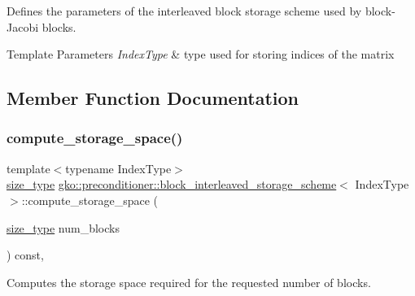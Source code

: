 Defines the parameters of the interleaved block storage scheme used by block-\/\+Jacobi blocks. 


\begin{DoxyTemplParams}{Template Parameters}
{\em Index\+Type} & type used for storing indices of the matrix \\
\hline
\end{DoxyTemplParams}


\subsection{Member Function Documentation}
\mbox{\label{structgko_1_1preconditioner_1_1block__interleaved__storage__scheme_ae46b38432c1e1b87d5743a649f2cfe84}} 
\subsubsection{\texorpdfstring{compute\+\_\+storage\+\_\+space()}{compute\_storage\_space()}}
{\footnotesize\ttfamily template$<$typename Index\+Type$>$ \\
\hyperlink{namespacegko_a6e5c95df0ae4e47aab2f604a22d98ee7}{size\+\_\+type} \hyperlink{structgko_1_1preconditioner_1_1block__interleaved__storage__scheme}{gko\+::preconditioner\+::block\+\_\+interleaved\+\_\+storage\+\_\+scheme}$<$ Index\+Type $>$\+::compute\+\_\+storage\+\_\+space (\begin{DoxyParamCaption}\item[{\hyperlink{namespacegko_a6e5c95df0ae4e47aab2f604a22d98ee7}{size\+\_\+type}}]{num\+\_\+blocks }\end{DoxyParamCaption}) const\hspace{0.3cm}{\ttfamily [inline]}, {\ttfamily [noexcept]}}



Computes the storage space required for the requested number of blocks. 


